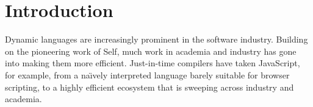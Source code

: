 
\section{Introduction}
\label{sec:introduction}

%
%

Dynamic languages are increasingly prominent in the software industry.
Building on the pioneering work of Self\citep{Self}, 
much work in academia and industry
has gone into making them more efficient\citep{Bolz2013,Bolz:2013:IMT,Wurthinger:2017:PPE,Daloze2016,Clifford:2015:MM,Degenbaev:2016:ITG}.
Just-in-time compilers have taken JavaScript, for example, from a
na{\"\i}vely interpreted language barely suitable for browser scripting, 
to a highly efficient ecosystem that is sweeping across industry
and academia\citep{githut2018}.


